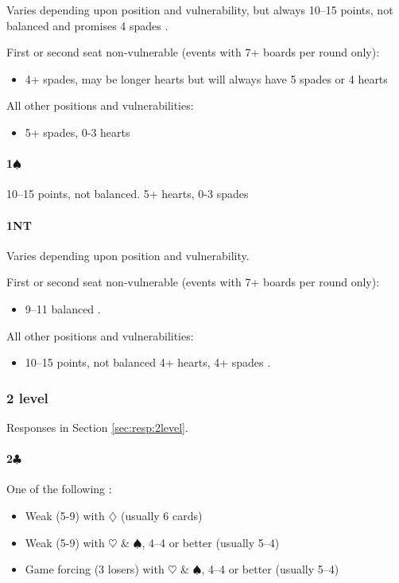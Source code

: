 \documentclass[a4paper,14pt]{extarticle}
\begin{document}
Varies depending upon position and vulnerability, but always 10--15 points, not
balanced and promises 4 spades .

First or second seat non-vulnerable (events with 7+ boards per round only):
\begin{itemize}
\item 4+ spades, may be longer hearts but will always have 5 spades or 4 hearts
\end{itemize}

All other positions and vulnerabilities:
\begin{itemize}
\item 5+ spades, 0-3 hearts
\end{itemize}

\paragraph{1$\spadesuit$}

10--15 points, not balanced. 5+ hearts, 0-3 spades 

\paragraph{1NT}

Varies depending upon position and vulnerability.

First or second seat non-vulnerable (events with 7+ boards per round only):
\begin{itemize}
\item 9--11 balanced .
\end{itemize}

All other positions and vulnerabilities:
\begin{itemize}
\item 10--15 points, not balanced 4+ hearts, 4+ spades .
\end{itemize}

\newpage 

\subsubsection{2 level}
\label{sec:open:2level}

Responses in Section \ref{sec:resp:2level}.

\paragraph{2$\clubsuit$}
One of the following :
\begin{itemize}
\item Weak (5-9) with $\diamondsuit$ (usually 6 cards)
\item Weak (5-9) with $\heartsuit$ \& $\spadesuit$, 4--4 or better (usually 5--4)
\item Game forcing (3 losers) with $\heartsuit$ \& $\spadesuit$, 4--4 or better (usually 5--4)
\end{itemize}
\end{document}
